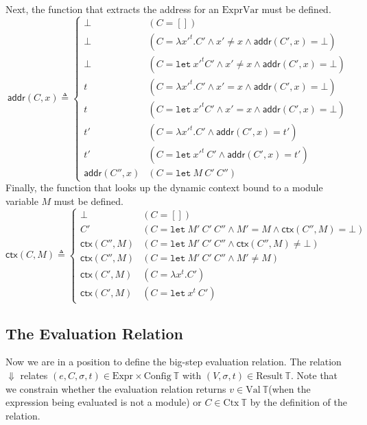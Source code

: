 \documentclass{article}
\theoremstyle{definition}
\newcommand*{\Expr}{\text{Expr}}
\newcommand*{\ExprVar}{\text{ExprVar}}
\newcommand*{\Time}{\mathbb{T}}
\newcommand*{\Ctx}[1]{\text{Ctx}\:{#1}}
\newcommand*{\Value}[1]{\text{Val}\:{#1}}
\newcommand*{\Config}[1]{\text{Config}\:{#1}}
\newcommand*{\Result}[1]{\text{Result}\:{#1}}
\newcommand*{\addr}{\mathsf{addr}}
\newcommand*{\modctx}{\mathsf{ctx}}
\begin{document}
Next, the function that extracts the address for an $\ExprVar$ must be defined.
\[
  \addr(C,x)\triangleq
  \begin{cases}
    \bot         & (C=[])                                                           \\
    \bot         & (C=\lambda x'^{t}.C'\wedge x'\neq x\wedge \addr(C',x)=\bot)      \\
    \bot         & (C=\mathtt{let}\:x'^{t}C'\wedge x'\neq x\wedge \addr(C',x)=\bot) \\
    t            & (C=\lambda x'^{t}.C'\wedge x'= x\wedge \addr(C',x)=\bot)         \\
    t            & (C=\mathtt{let}\:x'^{t}C'\wedge x'= x\wedge \addr(C',x)=\bot)    \\
    t'           & (C=\lambda x'^{t}.C'\wedge \addr(C',x)=t')                       \\
    t'           & (C=\mathtt{let}\:x'^{t}\:C'\wedge \addr(C',x)=t')                \\
    \addr(C'',x) & (C=\mathtt{let}\:M\:C'\:C'')
  \end{cases}
\]
Finally, the function that looks up the dynamic context bound to a module variable $M$ must be defined.
\[
  \modctx(C,M)\triangleq
  \begin{cases}
    \bot           & (C=[])                                                             \\
    C'             & (C=\mathtt{let}\:M'\:C'\:C''\wedge M'= M\wedge\modctx(C'',M)=\bot) \\
    \modctx(C'',M) & (C=\mathtt{let}\:M'\:C'\:C''\wedge\modctx(C'',M)\neq\bot)          \\
    \modctx(C'',M) & (C=\mathtt{let}\:M'\:C'\:C''\wedge M'\neq M)                       \\
    \modctx(C',M)  & (C=\lambda x^{t}.C')                                               \\
    \modctx(C',M)  & (C=\mathtt{let}\:x^{t}\:C')
  \end{cases}
\]

\subsection{The Evaluation Relation}

Now we are in a position to define the big-step evaluation relation.
The relation $\Downarrow$ relates $(e,C,\sigma,t)\in\Expr\times\Config{\Time}$ with
$(V,\sigma,t)\in\Result{\Time}$.
Note that we constrain whether the evaluation relation returns $v\in\Value{\Time}$(when the expression being evaluated is not a module) or $C\in\Ctx{\Time}$ by the definition of the relation.
\end{document}
